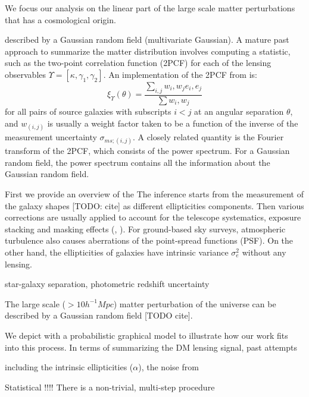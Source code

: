 We focus our analysis on the linear part of the large scale 
matter perturbations that has a cosmological origin.  

 described by a Gaussian random field (multivariate 
Gaussian). A mature past approach to summarize the matter distribution 
involves computing a statistic, such
as the two-point correlation function (2PCF) for each of the lensing
observables $\Upsilon = [\kappa, \gamma_1, \gamma_2]$. 
An implementation of the 2PCF from \cite{Jee2013a} is: 
\begin{equation}
	\xi_\Upsilon(\theta) = \frac{\sum_{i,j}w_i, w_j e_i, e_j}{\sum w_i, w_j}
	\label{eqn:2PCF}
\end{equation}
for all pairs of source galaxies with subscripts $i < j$ at an angular separation 
$\theta$, and $w_{(i, j)}$ is usually
a weight factor taken to be a function of 
the inverse of the measurement uncertainty $\sigma_{ms; (i, j)}$.  
A closely related quantity is the Fourier transform of the 2PCF, which consists
of the power spectrum. For a Gaussian random field, the power spectrum contains
all the information about the Gaussian random field.

First we provide an overview of the   
The inference starts from the measurement of the galaxy shapes [TODO: cite] as different
ellipticities components. Then various corrections are usually applied to 
account for the telescope systematics, exposure stacking and masking effects 
(\citealt{Rowe2010}, \citealt{Jee2013a}). For ground-based sky surveys,   
atmospheric turbulence also causes aberrations of the point-spread functions
(PSF). On the other hand, the ellipticities of galaxies have intrinsic
variance $\sigma_e^2$ without any lensing.    


star-galaxy separation, photometric redshift uncertainty  

The large scale ($> 10 h^{-1} Mpc$) matter perturbation of the universe can be  
described by a Gaussian random field [TODO cite].  






We depict with a probabilistic graphical model to illustrate how our work
fits into this process.
In terms of summarizing the DM lensing signal, past attempts   

 
including the intrinsic ellipticities ($\alpha$),
the noise from 

Statistical !!!!
There is a non-trivial, multi-step procedure 

